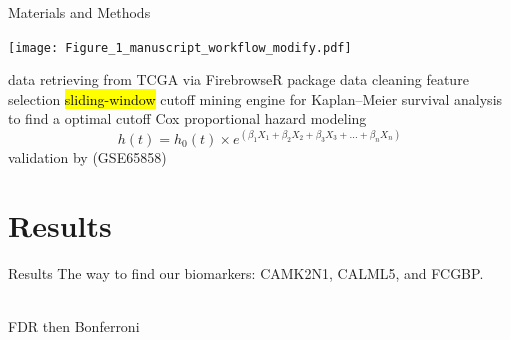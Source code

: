 \documentclass[paperwidth=78cm,paperheight=110cm,portrait]{baposter}
\begin{document}
\begin{poster}
\begin{posterbox}[name=lists,column=0,below=intro, ,above=bottom]{Materials and Methods}
\begin{outline}
\begin{center}
    \texttt{[image: Figure\_1\_manuscript\_workflow\_modify.pdf]}
    \label{fig:workflow}
\end{center}   
        \1 data retrieving from TCGA via FirebrowseR package
            \2 data cleaning
            \2 feature selection
        \1 \hl{sliding-window} cutoff mining engine for Kaplan--Meier survival analysis to find a optimal cutoff
        \1 Cox proportional hazard modeling~\cite{Cox1972,Bradburn2003b}\: %
$$h(t) = h_0(t) \times e^{(\beta_1 X_1 + \beta_2 X_2 + \beta_3 X_3 + ... + \beta_n X_n)}$$
        \1 validation by (GSE65858)~\cite{Wichmann2015}
\end{outline}
\end{posterbox}
%



\section{Results}

\begin{posterbox}[name=install,span=2,column=1,row=0]{Results}
The way to find our biomarkers: CAMK2N1, CALML5, and FCGBP.
\end{posterbox}\\
 FDR then Bonferroni\\
 



\end{poster}
\end{document}
